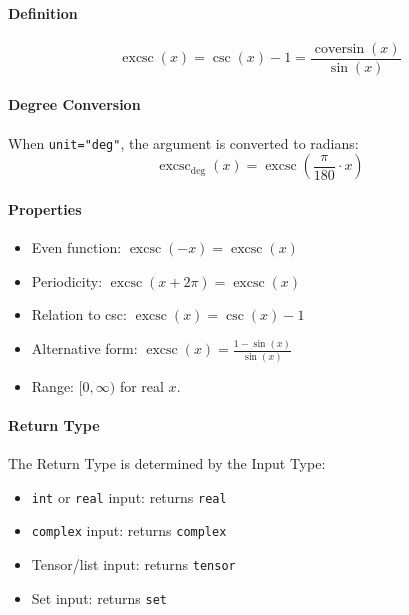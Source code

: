 \paragraph{Definition}
\[
\operatorname{excsc}(x) = \csc(x) - 1 = \frac{\operatorname{coversin}(x)}{\sin(x)}
\]

\paragraph{Degree Conversion}
When \texttt{unit="deg"}, the argument is converted to radians:
\[
\operatorname{excsc}_{\text{deg}}(x) = \operatorname{excsc}\left(\frac{\pi}{180} \cdot x\right)
\]

\paragraph{Properties}
\begin{itemize}
\item Even function: $\operatorname{excsc}(-x) = \operatorname{excsc}(x)$
\item Periodicity: $\operatorname{excsc}(x + 2\pi) = \operatorname{excsc}(x)$
\item Relation to csc: $\operatorname{excsc}(x) = \csc(x) - 1$
\item Alternative form: $\operatorname{excsc}(x) = \frac{1 - \sin(x)}{\sin(x)}$
\item Range: $[0, \infty)$ for real $x$.
\end{itemize}

\paragraph{Return Type}
The Return Type is determined by the Input Type:
\begin{itemize}
\item \texttt{int} or \texttt{real} input: returns \texttt{real}
\item \texttt{complex} input: returns \texttt{complex}
\item Tensor/list input: returns \texttt{tensor}
\item Set input: returns \texttt{set}
\end{itemize}

